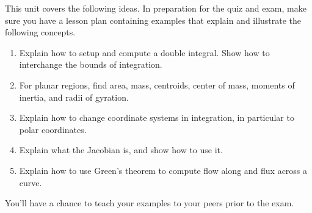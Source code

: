 \newcommand{\sageDoubleIntegralCheckerURL}{http://bmw.byuimath.com/dokuwiki/doku.php?id=double_integral_calculator}


\noindent 
This unit covers the following ideas. In preparation for the quiz and exam, make sure you have a lesson plan containing examples that explain and illustrate the following concepts.  
\begin{enumerate}
\item Explain how to setup and compute a double integral. Show how to interchange the bounds of integration. 
\item For planar regions, find area, mass, centroids, center of mass, moments of inertia, and radii of gyration.
\item Explain how to change coordinate systems in integration, in particular to polar coordinates. 
\item Explain what the Jacobian is, and show how to use it.
\item Explain how to use Green's theorem to compute flow along and flux across a curve. 
\end{enumerate}
You'll have a chance to teach your examples to your peers prior to the exam.


